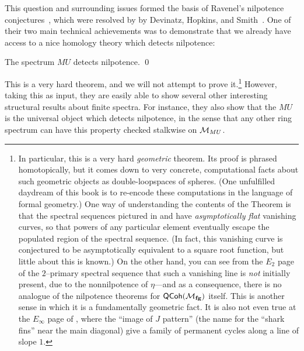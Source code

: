 This question and surrounding issues formed the basis of Ravenel's nilpotence conjectures~\cite[Section 10]{RavenelLocalizationWRTPeriodic}, which were resolved by by Devinatz, Hopkins, and Smith~\cite{DHS,HopkinsSmith}.  One of their two main technical achievements was to demonstrate that we already have access to a nice homology theory which detects nilpotence:

\begin{theorem}\label{DevinatzHopkinsSmith}
The spectrum $MU$ detects nilpotence. \qed
\end{theorem}

\noindent This is a very hard theorem, and we will not attempt to prove it.\footnote{In particular, this is a very hard \emph{geometric} theorem.  Its proof is phrased homotopically, but it comes down to very concrete, computational facts about such geometric objects as double-loopspaces of spheres.  (One unfulfilled daydream of this book is to re-encode these computations in the language of formal geometry.)  One way of understanding the contents of the Theorem is that the spectral sequences pictured in  and  have \emph{asymptotically flat} vanishing curves, so that powers of any particular element eventually escape the populated region of the spectral sequence.  (In fact, this vanishing curve is conjectured to be asymptotically equivalent to a square root function, but little about this is known.)  On the other hand, you can see from the $E_2$ page of the $2$--primary spectral sequence that such a vanishing line is \emph{not} initially present, due to the nonnilpotence of $\eta$---and as a consequence, there is no analogue of the nilpotence theorems for $\mathsf{QCoh}(\mathcal{M}_{\mathbf{fg}})$ itself.  This is another sense in which it is a fundamentally geometric fact.  It is also not even true at the $E_\infty$ page of , where the ``image of $J$ pattern'' (the name for the ``shark fins'' near the main diagonal) give a family of permanent cycles along a line of slope $1$.}
However, taking this as input, they are easily able to show several other interesting structural results about finite spectra.  For instance, they also show that the $MU$ is the universal object which detects nilpotence, in the sense that any other ring spectrum can have this property checked stalkwise on $\mathcal{M}_{MU}$.


